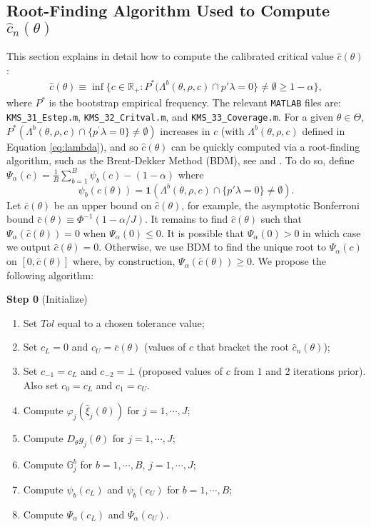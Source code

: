 \documentclass[12pt]{article}
\def\code#1{\texttt{#1}}
\begin{document}
\subsection{Root-Finding Algorithm Used to Compute $\hat{c}_n(\theta)$}\label{sec:critval}
This section explains in detail how to compute the calibrated critical value $\hat{c}(\theta)$:
\begin{align}
\hat c(\theta) \equiv \inf \{c \in \mathbb{R}_+ : P^*(\Lambda^b(\theta,\rho,c) \cap p'\lambda = 0 \} \neq \emptyset \geq 1-\alpha\},
\end{align}
where $P^*$ is the bootstrap empirical frequency.  The relevant \code{MATLAB} files are: \code{KMS\_31\_Estep.m}, \code{KMS\_32\_Critval.m}, and  \code{KMS\_33\_Coverage.m}.  For a given $\theta \in \Theta$, $P^*(\Lambda^b (\theta ,\rho ,c)\cap \{p^{\prime }\lambda =0\}\neq \emptyset)$ increases in $c$ (with $\Lambda^b (\theta ,\rho ,c)$ defined in Equation \eqref{eq:lambda}), and so $\hat c(\theta)$ can be quickly computed via a root-finding algorithm, such as the Brent-Dekker Method (BDM), see  and .  To do so, define $\Psi_{\alpha}(c) = \frac{1}{B} \sum_{b=1}^B \psi_b(c) - (1-\alpha)$ where
\[
\psi_b(c(\theta)) = \mathbf{1}(\Lambda^b(\theta,\rho,c) \cap \{p'\lambda = 0\}\neq \emptyset).
\]
Let $\bar c(\theta)$ be an upper bound on $\hat c(\theta)$, for example, the asymptotic Bonferroni bound $\bar c(\theta) \equiv \Phi^{-1}(1-\alpha/J)$.  It remains to find $\hat c(\theta)$ such that $\Psi_{\alpha}(\hat c(\theta)) =  0$ when $\Psi_{\alpha}(0)\leq 0$.  It is possible that $\Psi_{\alpha}(0) > 0$ in which case we output $\hat c(\theta) = 0$.  Otherwise, we use BDM to find the unique root to $\Psi_{\alpha}(c)$ on $[0,\bar c(\theta)]$ where, by construction, $\Psi_{\alpha}(\bar c(\theta)) \geq 0$.  We propose the following algorithm:

\textbf{Step 0} (Initialize)
\begin{enumerate}
\item Set $\mathit{Tol}$ equal to a chosen tolerance value;
\item Set $c_L = 0$ and $c_U =\bar c(\theta)$ (values of $c$ that bracket the root $\hat c_n(\theta)$);
\item Set $c_{-1} = c_L$ and $c_{-2} = \bot$  (proposed values of $c$ from $1$ and $2$ iterations prior).  Also set $c_0 = c_L$ and $c_1 = c_U$.
\item Compute $\varphi_j( \hat \xi_{j}(\theta))$ for $j = 1,\cdots,J$;
\item Compute $D_{\theta}g_j(\theta)$ for $j=1,\cdots,J$;
\item Compute $\mathbb{G}^b_{j}$ for $b = 1,\cdots,B$, $j = 1,\cdots,J$;
\item Compute $\psi_b(c_L)$ and $\psi_b(c_U)$ for $b = 1,\cdots,B$;
\item Compute $\Psi_{\alpha}(c_L)$ and $\Psi_{\alpha}(c_U)$.
\end{enumerate}
\end{document}
